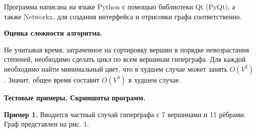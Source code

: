 \documentclass[12pt,a4paper]{article}
\begin{document}
\indent Программа написана на языке Python с помощью библиотеки Qt (PyQt), а также Networkx, для создания интерфейса и отрисовки графа соответственно.

\begin{center}
   \textbf{Оценка сложности алгоритма.}
\end{center}
\setlength\parindent{24pt}

\indent Не учитывая время, затраченное на сортировку вершин в порядке невозрастания степеней, необходимо сделать цикл по всем вершинам гиперграфа. Для каждой необходимо найти минимальный цвет, что в худшем случае может занять $O(V^2)$. Значит, общее время составит $O(V^3)$ в худшем случае.

\begin{center}
   \textbf{Тестовые примеры. Скриншоты программ.}
\end{center}
\textbf{Пример 1.} Вводится частный случай гиперграфа с 7 вершинами и 11 рёбрами. Граф представлен на рис. 1.
\end{document}
